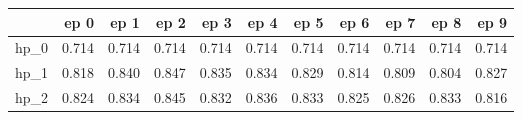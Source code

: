 \begin{tabular}{lrrrrrrrrrr}
\toprule
{} &   ep 0 &   ep 1 &   ep 2 &   ep 3 &   ep 4 &   ep 5 &   ep 6 &   ep 7 &   ep 8 &   ep 9 \\
\midrule
hp\_0 &  0.714 &  0.714 &  0.714 &  0.714 &  0.714 &  0.714 &  0.714 &  0.714 &  0.714 &  0.714 \\
hp\_1 &  0.818 &  0.840 &  0.847 &  0.835 &  0.834 &  0.829 &  0.814 &  0.809 &  0.804 &  0.827 \\
hp\_2 &  0.824 &  0.834 &  0.845 &  0.832 &  0.836 &  0.833 &  0.825 &  0.826 &  0.833 &  0.816 \\
\bottomrule
\end{tabular}
